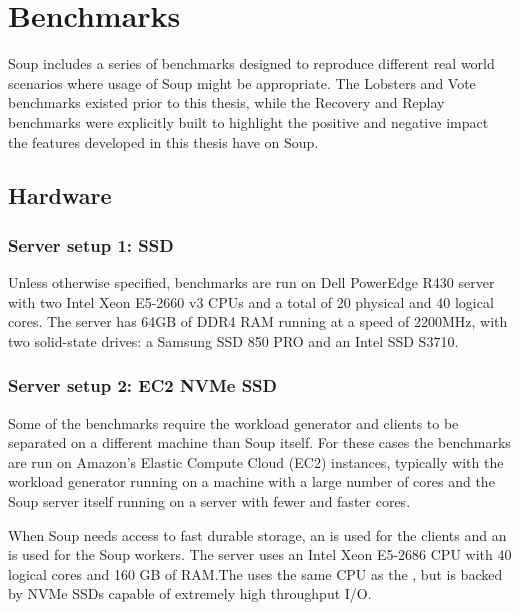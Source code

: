 \chapter{Benchmarks}\label{chap:benchmarks}

Soup includes a series of benchmarks designed to reproduce different real world
scenarios where usage of Soup might be appropriate. The Lobsters and Vote
benchmarks existed prior to this thesis, while the Recovery and Replay
benchmarks were explicitly built to highlight the positive and negative impact
the features developed in this thesis have on Soup.

\newpage

\section{Hardware}

\subsection{Server setup 1: SSD}\label{sec:server-1}

Unless otherwise specified, benchmarks are run on Dell PowerEdge R430 server
with two Intel Xeon E5-2660 v3 CPUs and a total of 20 physical and 40 logical
cores. The server has 64GB of DDR4 RAM running at a speed of 2200MHz, with two
solid-state drives: a Samsung SSD 850 PRO and an Intel SSD S3710.

\subsection{Server setup 2: EC2 NVMe SSD}\label{sec:server-2}

Some of the benchmarks require the workload generator and clients to be
separated on a different machine than Soup itself. For these cases the
benchmarks are run on Amazon's Elastic Compute Cloud (EC2)
instances, typically with the
workload generator running on a machine with a large number of cores and the
Soup server itself running on a server with fewer and faster cores.

When Soup needs access to fast durable storage, an  is used
for the clients and an  is used for the Soup workers. The
 server uses an Intel Xeon E5-2686 CPU with 40 logical cores
and 160 GB of RAM.\@ The  uses the same CPU as the ,
but is backed by NVMe SSDs capable of extremely high throughput I/O.

